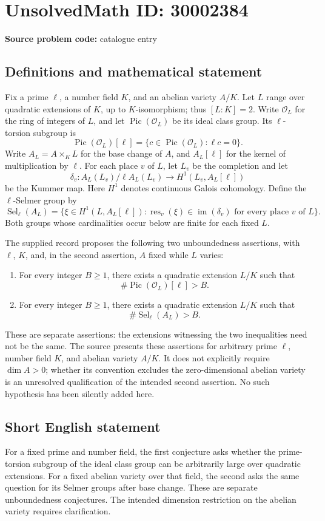 \documentclass[11pt]{article}
\begin{document}
\section*{UnsolvedMath ID: 30002384}
\textbf{Source problem code:} catalogue entry
\subsection{Definitions and mathematical statement}
Fix a prime \(\ell\), a number field \(K\), and an abelian variety \(A/K\). Let \(L\) range over quadratic extensions of \(K\), up to \(K\)-isomorphism; thus \([L:K]=2\). Write \(\mathcal O_L\) for the ring of integers of \(L\), and let \(\operatorname{Pic}(\mathcal O_L)\) be its ideal class group. Its \(\ell\)-torsion subgroup is
\[
\operatorname{Pic}(\mathcal O_L)[\ell]
=\{c\in\operatorname{Pic}(\mathcal O_L):\ell c=0\}.
\]
Write \(A_L=A\times_K L\) for the base change of \(A\), and \(A_L[\ell]\) for the kernel of multiplication by \(\ell\). For each place \(v\) of \(L\), let \(L_v\) be the completion and let
\[
\delta_v:A_L(L_v)/\ell A_L(L_v)\longrightarrow H^1(L_v,A_L[\ell])
\]
be the Kummer map. Here \(H^1\) denotes continuous Galois cohomology. Define the \(\ell\)-Selmer group by
\[
\operatorname{Sel}_{\ell}(A_L)
=\{\xi\in H^1(L,A_L[\ell]):
\operatorname{res}_v(\xi)\in\operatorname{im}(\delta_v)
\text{ for every place }v\text{ of }L\}.
\]
Both groups whose cardinalities occur below are finite for each fixed \(L\).

The supplied record proposes the following two unboundedness assertions, with \(\ell\), \(K\), and, in the second assertion, \(A\) fixed while \(L\) varies:
\begin{enumerate}
\item For every integer \(B\geq 1\), there exists a quadratic extension \(L/K\) such that
\[
\#\operatorname{Pic}(\mathcal O_L)[\ell]>B.
\]
\item For every integer \(B\geq 1\), there exists a quadratic extension \(L/K\) such that
\[
\#\operatorname{Sel}_{\ell}(A_L)>B.
\]
\end{enumerate}
These are separate assertions: the extensions witnessing the two inequalities need not be the same. The source presents these assertions for arbitrary prime \(\ell\), number field \(K\), and abelian variety \(A/K\). It does not explicitly require \(\dim A>0\); whether its convention excludes the zero-dimensional abelian variety is an unresolved qualification of the intended second assertion. No such hypothesis has been silently added here.
\subsection{Short English statement}
For a fixed prime and number field, the first conjecture asks whether the prime-torsion subgroup of the ideal class group can be arbitrarily large over quadratic extensions. For a fixed abelian variety over that field, the second asks the same question for its Selmer groups after base change. These are separate unboundedness conjectures. The intended dimension restriction on the abelian variety requires clarification.
\end{document}

